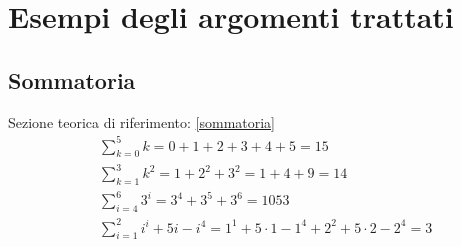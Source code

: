 
\section{Esempi degli argomenti trattati}
\subsection{Sommatoria}
Sezione teorica di riferimento: \ref{sommatoria}
\begin{align*}
    &\sum_{k = 0}^{5} k = 0 + 1 + 2 + 3 + 4 + 5= 15\\
    &\sum_{k = 1}^{3} k^2 = 1 + 2^2 + 3^2 = 1 + 4 + 9 = 14\\
    &\sum_{i = 4}^{6} 3^i = 3^{4} + 3^{5} + 3^{6} = 1053\\
    &\sum_{i = 1}^{2} i^i + 5i -i^4 = 1^1 + 5\cdot 1 - 1^4 + 2^2 + 5\cdot 2 - 2^4 = 3
\end{align*}